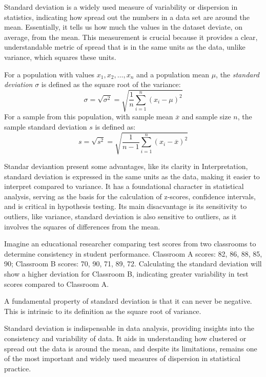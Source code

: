 Standard deviation is a widely used measure of variability or dispersion in statistics, indicating how spread out the numbers in a data set are around the mean. Essentially, it tells us how much the values in the dataset deviate, on average, from the mean. This measurement is crucial because it provides a clear, understandable metric of spread that is in the same units as the data, unlike variance, which squares these units.

\begin{definition}
For a population with values \(x_1, x_2, \dots, x_n\) and a population mean \(\mu\), the \emph{standard deviation} \( \sigma \) is defined as the square root of the variance:
\[
\sigma = \sqrt{\sigma^2} = \sqrt{\frac{1}{n} \sum_{i=1}^n (x_i - \mu)^2}
\]
For a sample from this population, with sample mean \(\overline{x}\) and sample size \(n\), the sample standard deviation \( s \) is defined as:
\[
s = \sqrt{s^2} = \sqrt{\frac{1}{n-1} \sum_{i=1}^n (x_i - \overline{x})^2}
\]
\end{definition}

Standar deviantion present some advantages, like its clarity in Interpretation, standard deviation is expressed in the same units as the data, making it easier to interpret compared to variance. It has a foundational character in statistical analysis, serving as the basis for the calculation of z-scores, confidence intervals, and is critical in hypothesis testing. Its main disacvantage is its sensitivity to outliers, like variance, standard deviation is also sensitive to outliers, as it involves the squares of differences from the mean.

\begin{example}
Imagine an educational researcher comparing test scores from two classrooms to determine consistency in student performance. Classroom A scores: 82, 86, 88, 85, 90; Classroom B scores: 70, 90, 71, 89, 72. Calculating the standard deviation will show a higher deviation for Classroom B, indicating greater variability in test scores compared to Classroom A.
\end{example}

A fundamental property of standard deviation is that it can never be negative. This is intrinsic to its definition as the square root of variance.

Standard deviation is indispensable in data analysis, providing insights into the consistency and variability of data. It aids in understanding how clustered or spread out the data is around the mean, and despite its limitations, remains one of the most important and widely used measures of dispersion in statistical practice.

